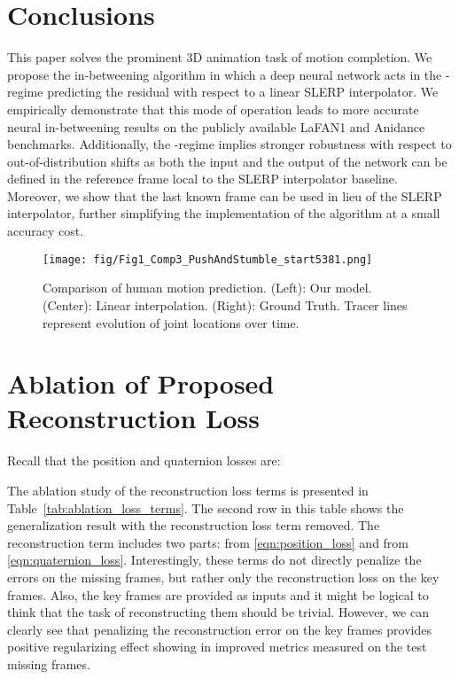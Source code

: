 \documentclass[letterpaper]{article} \usepackage[]{aaai23}  \usepackage{times}  \usepackage{helvet}  \usepackage{courier}  \usepackage[hyphens]{url}  \usepackage{graphicx} \urlstyle{rm} \def\UrlFont{\rm}  \usepackage{natbib}  \usepackage{caption} \frenchspacing  \setlength{\pdfpagewidth}{8.5in} \setlength{\pdfpageheight}{11in}
\begin{document}
\section{Conclusions} \label{sec:conclusions}
This paper solves the prominent 3D animation task of motion completion. We propose the in-betweening algorithm in which a deep neural network acts in the -regime predicting the residual with respect to a linear SLERP interpolator. We empirically demonstrate that this mode of operation leads to more accurate neural in-betweening results on the publicly available LaFAN1 and Anidance benchmarks. Additionally, the -regime implies stronger robustness with respect to out-of-distribution shifts as both the input and the output of the network can be defined in the reference frame local to the SLERP interpolator baseline. Moreover, we show that the last known frame can be used in lieu of the SLERP interpolator, further simplifying the implementation of the algorithm at a small accuracy cost. 









\clearpage
\appendix



\begin{figure*}[t!]
    \centering
    \texttt{[image: fig/Fig1\_Comp3\_PushAndStumble\_start5381.png]}
    \caption{Comparison of human motion prediction. (Left): Our model. (Center): Linear interpolation. (Right): Ground Truth. Tracer lines represent evolution of joint locations over time.}
    \label{fig:bonus_pic}
\end{figure*}






\section{Ablation of Proposed Reconstruction Loss}
\label{ssec:ablation_of_reconstruction_loss}

Recall that the position and quaternion losses are:



The ablation study of the reconstruction loss terms is presented in Table~\ref{tab:ablation_loss_terms}. The second row in this table shows the generalization result with the reconstruction loss term removed. The reconstruction term includes two parts:  from \eqref{eqn:position_loss} and  from \eqref{eqn:quaternion_loss}. Interestingly, these terms do not directly penalize the errors on the missing frames, but rather only the reconstruction loss on the key frames. Also, the key frames are provided as inputs and it might be logical to think that the task of reconstructing them should be trivial. However, we can clearly see that penalizing the reconstruction error on the key frames provides positive regularizing effect showing in improved metrics measured on the test missing frames.
\end{document}
